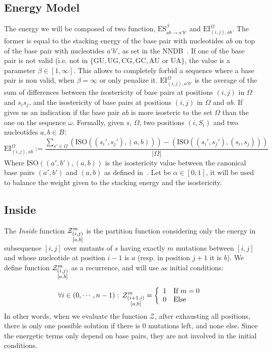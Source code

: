 \subsection{Energy Model}
The energy we will be composed of two function, $\text{ES}^{\beta}_{ab\to a'b'}$ and 
$\text{EI}^{\Omega}_{(i,j),ab}$. The former is equal to the 
stacking energy of the base pair with nucleotides $ab$ on top of the base pair with nucleotides 
$a'b'$, as set in the NNDB~\cite{Turner2010}. If one of the base pair is not valid (i.e. not in 
$\{\text{GU},\text{UG},\text{CG},\text{GC}, \text{AU or UA}\}$, the value is a parameter 
$\beta \in [1,\infty]$. This allows
to completely forbid a sequence where a base pair is non valid, when $\beta = \infty$ or only 
penalize it.
$\text{EI}^{\Omega}_{(i,j), a'b'}$ is the average of the sum of differences between the isostericity
of base pairs at positions $(i,j)$ in $\Omega$ and $s_is_j$, and the isostericity of base pairs
 at positions $(i,j)$ in $\Omega$ and $ab$. If gives us an indication 
 if the base pair $ab$ is more isosteric to the set $\Omega$ than the one on the sequence 
 $\omega$. Formally, given $s$, $\Omega$, two positions $(i,S_i)$ and two nucleotides $a,b\in B$:
 $$
 	\text{EI}^{\Omega}_{(i,j),ab}:=
	\frac{
		\displaystyle
		\sum_{s'\in\Omega}
		\left(
			\text{ISO}((s_i',s_j'),(a,b))
		\right)-
		\left(
			\text{ISO}((s_i',s_j'),(s_i,s_j))		
		\right)
	}{
		\displaystyle
		|\Omega|
	}
 $$
  Where $\text{ISO}((a',b'),(a,b))$ is the isostericity value 
 between  the canonical base pairs $(a',b')$ and $(a,b)$  as defined in~\cite{Stombaugh2009}. 
 Let be $\alpha\in[0,1]$, it 
 will be used to balance the weight given to the stacking energy and the isostericity.
	
\subsection{Inside}
The \emph{Inside} function $\Z{i,j}{m}{a,b}$ is the partition function considering only the 
energy in subsequence $[i,j]$ over mutants of $s$ having exactly $m$ mutations between $[i,j]$ and whose nucleotide at position $i-1$ is $a$ (resp. in position $j+1$ it is $b$).
We define function $\Z{i,j}{m}{a,b}$ as a recurrence, and will use as initial conditions:

\[
	\forall i \in (0,\cdots,n-1):\, \Z{i+1,i}{m}{a,b}=\left\{
	\begin{array}{ll}
		1 &\text{If } m = 0\\
		0 &\text{Else }
	\end{array}\right.
\]
In other words, when we evaluate the function $\mathcal Z$, after exhausting all positions, there 
is only one possible solution if there is $0$ mutations left, and none else. Since the 
energetic terms only depend on base pairs, they are not involved in the initial conditions. 

